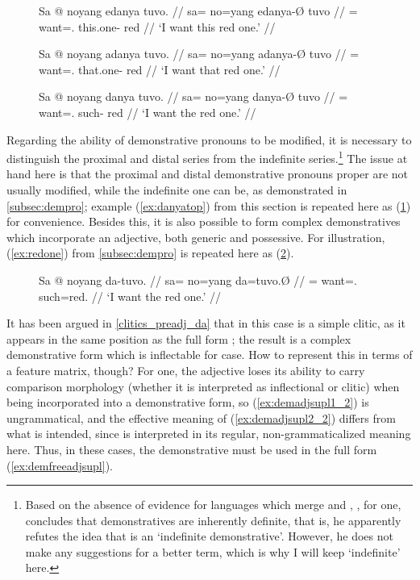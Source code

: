 \begin{figure}
\pex
\a\ljudge\ques\begingl
	\gla Sa @ noyang edanya tuvo. //
	\glb sa= no=yang edanya-Ø tuvo //
	\glc \PatT{}= want=\Fsg{}.\Aarg{} this.one-\Top{} red //
	\glft `I want this red one.' //
\endgl

\a\ljudge\ques\begingl
	\gla Sa @ noyang adanya tuvo. //
	\glb sa= no=yang adanya-Ø tuvo //
	\glc \PatT{}= want=\Fsg{}.\Aarg{} that.one-\Top{} red //
	\glft `I want that red one.' //
\endgl

\a\label{ex:danyatop2}\begingl
	\gla Sa @ noyang danya tuvo. //
	\glb sa= no=yang danya-Ø tuvo //
	\glc \PatT{}= want=\Fsg{}.\Aarg{} such-\Top{} red //
	\glft `I want the red one.' //
\endgl
\xe
\end{figure}

Regarding the ability of demonstrative pronouns to be modified, it is
necessary to distinguish the proximal  and distal
series from the indefinite series.\footnote{Based
on the absence of evidence for languages which merge  and ,
\citet[152]{lyons1999}, for one, concludes that demonstratives are inherently
definite, that is, he apparently refutes the idea that  is an
`indefinite demonstrative'. However, he does not make any suggestions for a
better term, which is why I will keep `indefinite' here.} The issue at hand
here is that the proximal and distal demonstrative pronouns proper are not
usually modified, while the indefinite one can be, as demonstrated in
\autoref{subsec:dempro}; example (\ref{ex:danyatop}) from this section is
repeated here as (\ref{ex:danyatop2}) for convenience. Besides this, it is also
possible to form complex demonstratives which incorporate an adjective, both
generic and possessive. For illustration, (\ref{ex:redone}) from
\autoref{subsec:dempro} is repeated here as (\ref{ex:redone2}).

\begin{figure}[h]
\ex\label{ex:redone2}\begingl
	\gla Sa @ noyang da-tuvo. //
	\glb sa= no=yang da=tuvo.Ø //
	\glc \PatT{}= want=\Fsg{}.\Aarg{} such=red.\Top{} //
	\glft `I want the red one.' //
\endgl\xe
\end{figure}

It has been argued in \autoref{clitics_preadj_da} that  in this
case is a simple clitic, as it appears in the same position as the full form
; the result is a complex demonstrative form which is
inflectable for case. How to represent this in terms of a feature matrix,
though? For one, the adjective loses its ability to carry comparison morphology
(whether it is interpreted as inflectional or clitic) when being incorporated
into a demonstrative form, so (\ref{ex:demadjsupl1_2}) is ungrammatical, and
the effective meaning of (\ref{ex:demadjsupl2_2}) differs from what is
intended, since  is interpreted in its regular,
non-grammaticalized meaning here. Thus, in these cases, the demonstrative must
be used in the full form (\ref{ex:demfreeadjsupl}).

